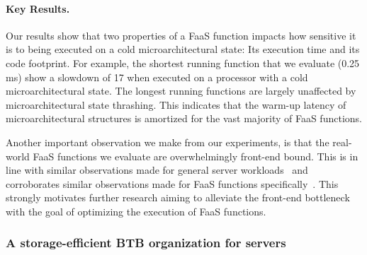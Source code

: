 \documentclass[../main.tex]{subfiles}
\begin{document}
\begin{refsection}
\paragraph{Key Results.}
Our results show that two properties of a FaaS function impacts how
sensitive it is to being executed on a cold microarchitectural state:
Its execution time and its code footprint. For example, the shortest
running function that we evaluate (0.25 ms) show a slowdown of
17\texttimes{} when executed on a processor with a cold microarchitectural
state. The longest running functions are largely unaffected by
microarchitectural state thrashing. This indicates that the warm-up
latency of microarchitectural structures is amortized for the vast
majority of FaaS functions.

Another important observation we make from our experiments, is that
the real-world FaaS functions we evaluate are overwhelmingly front-end
bound. This is in line with similar observations made for general
server
workloads~\cite{ferdman12_clear_cloud,kanev15_profil,ayers19_asmdb}
and corroborates similar observations made for FaaS functions specifically~\cite{lukewarm_serverless}. This
strongly motivates further research aiming to alleviate the front-end
bottleneck with the goal of optimizing the execution of FaaS
functions.



\subsubsection{A storage-efficient BTB organization for servers}
\label{subsub:btbx}


\end{refsection}
\end{document}
